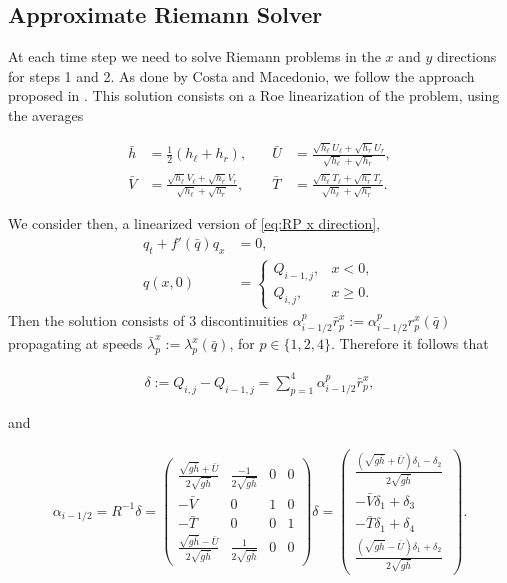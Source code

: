 \documentclass[12pt]{article}
\newcommand{\sgh}{\sqrt{g\bar{h}}} %
\begin{document}
\subsection{Approximate Riemann Solver}

At each time step we need to solve Riemann problems in the $x$ and $y$ directions for steps 1 and 2. 
As done by Costa and Macedonio, we follow the approach proposed in \cite{monthe1999positivity}. 
This solution consists on a Roe linearization of the problem, using the averages

\begin{align}
    \label{eq: Roe averages}
    \bar{h}&=\frac12(h_\ell+h_r), \quad & 
    \bar{U}&=\frac{\sqrt{h_\ell}U_\ell+\sqrt{h_r}U_r}{\sqrt{h_\ell}+\sqrt{h_r}},\\
    \bar{V}&=\frac{\sqrt{h_\ell}V_\ell+\sqrt{h_r}V_r}{\sqrt{h_\ell}+\sqrt{h_r}}, \quad &
    \bar{T}&=\frac{\sqrt{h_\ell}T_\ell+\sqrt{h_r}T_r}{\sqrt{h_\ell}+\sqrt{h_r}}.
\end{align}

We consider then, a linearized version of \eqref{eq:RP x direction},
\begin{align}
            \label{eq:RP x direction Roe}
            q_t+f'(\bar{q})q_x&=0,\\
            q(x,0)&=\begin{cases}
                Q_{i-1,j}, &x<0,\\
                Q_{i,j}, &x\geq 0.
            \end{cases}
\end{align}
Then the solution consists of 3 discontinuities $\alpha^p_{i-1/2}\bar{r}^x_p:=\alpha^p_{i-1/2}r^x_p(\bar{q})$ propagating at speeds $\bar{\lambda}^x_p:=\lambda^x_p(\bar{q})$, for $p\in\{1,2,4\}$. 
Therefore it follows that

\begin{align}
   \delta:= Q_{i,j}-Q_{i-1,j}=\sum_{p=1}^4 \alpha^p_{i-1/2}\bar{r}^x_p,
\end{align}

and

\begin{align}
    \alpha_{i-1/2}=
    R^{-1}\delta=
    \begin{pmatrix}
        \frac{\sgh+\bar{U}}{2\sgh} & \frac{-1}{2\sgh} & 0 & 0 \\
        -\bar{V} & 0 & 1 & 0\\
        -\bar{T} & 0 & 0 & 1\\
        \frac{\sgh-\bar{U}}{2\sgh} & \frac{1}{2\sgh} & 0 & 0
    \end{pmatrix}
    \delta=
    \begin{pmatrix}
        \frac{ (\sgh+\bar{U})\delta_1-\delta_2}{2\sgh}\\
        -\bar{V}\delta_1+\delta_3\\
        -\bar{T}\delta_1+\delta_4\\
        \frac{ (\sgh-\bar{U})\delta_1+\delta_2}{2\sgh}\
    \end{pmatrix}.
\end{align}
\end{document}

